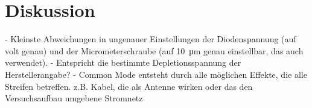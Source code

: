 \section{Diskussion}
\label{sec:Diskussion}

- Kleinste Abweichungen in ungenauer Einstellungen der Diodenspannung (auf volt genau)
und der Micrometerschraube (auf \SI{10}{\micro\meter} genau einstellbar, das auch
verwendet).
- Entspricht die bestimmte Depletionsspannung der Herstellerangabe?
- Common Mode entsteht durch alle möglichen Effekte, die alle Streifen betreffen.
z.B. Kabel, die als Antenne wirken oder das den Versuchsaufbau umgebene Stromnetz
